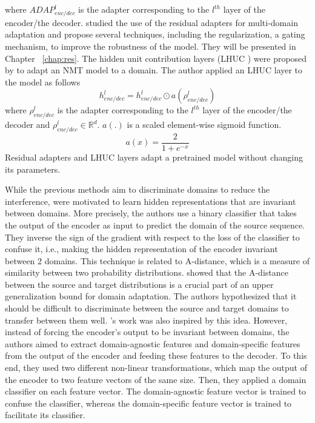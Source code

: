 where $ADAP_{enc/dec}^l$ is the adapter corresponding to the $l^{th}$ layer of the encoder/the decoder. \citet{Pham20Study} studied the use of the residual adapters for multi-domain adaptation and propose several techniques, including the regularization, a gating mechanism, to improve the robustness of the model. They will be presented in Chapter ~\ref{chap:res}. The hidden unit contribution layers (LHUC ) were proposed by \citet{Vilar18learning} to adapt an NMT model to a domain. The author applied an LHUC layer to the model as follows
\begin{equation}
h_{enc/dec}^l = h_{enc/dec}^{l} \odot a(\rho^{l}_{enc/dec})
\end{equation}
where $\rho^{l}_{enc/dec}$ is the adapter corresponding to the $l^{th}$ layer of the encoder/the decoder and $\rho^{l}_{enc/dec} \in \mathbb{R}^d$. $a(.)$ is a scaled
element-wise sigmoid function.
$$a(x) = \frac{2}{1+e^{-x}}$$
Residual adapters and LHUC layers adapt a pretrained model without changing its parameters. 

While the previous methods aim to discriminate domains to reduce the interference, \citet{Britz17effective} were motivated to learn hidden representations that are invariant between domains. More precisely, the authors use a binary classifier that takes the output of the encoder as input to predict the domain of the source sequence. They inverse the sign of the gradient with respect to the loss of the classifier to confuse it, i.e., making the hidden representation of the encoder invariant between 2 domains. This technique is related to A-distance, which is a measure of similarity between two probability distributions. \citet{Ben07analysis} showed that the A-distance between the source and target distributions is a crucial part of an upper generalization bound for domain adaptation. The authors hypothesized that it should be difficult to discriminate between the source and target domains to transfer between them well. \citet{Zeng18multidomain}'s work was also inspired by this idea. However, instead of forcing the encoder's output to be invariant between domains, the authors aimed to extract domain-agnostic features and domain-specific features from the output of the encoder and feeding these features to the decoder. To this end, they used two different non-linear transformations, which map the output of the encoder to two feature vectors of the same size. Then, they applied a domain classifier on each feature vector. The domain-agnostic feature vector is trained to confuse the classifier, whereas the domain-specific feature vector is trained to facilitate its classifier.

